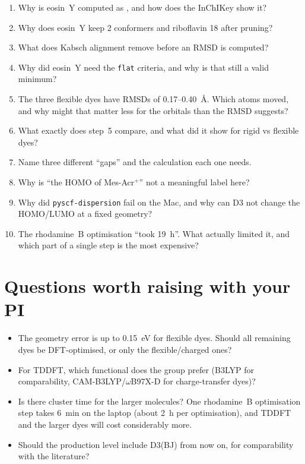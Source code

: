\documentclass[11pt,a4paper]{article}
\begin{document}
\begin{enumerate}
  \item Why is eosin~Y computed as , and how does the InChIKey show it?
  \item Why does eosin~Y keep 2 conformers and riboflavin 18 after pruning?
  \item What does Kabsch alignment remove before an RMSD is computed?
  \item Why did eosin~Y need the \texttt{flat} criteria, and why is that still a valid minimum?
  \item The three flexible dyes have RMSDs of 0.17--0.40~\AA. Which atoms moved, and why might
  that matter less for the orbitals than the RMSD suggests?
  \item What exactly does step~5 compare, and what did it show for rigid vs flexible dyes?
  \item Name three different ``gaps'' and the calculation each one needs.
  \item Why is ``the HOMO of Mes-Acr$^+$'' not a meaningful label here?
  \item Why did \texttt{pyscf-dispersion} fail on the Mac, and why can D3 not change the HOMO/LUMO
  at a fixed geometry?
  \item The rhodamine~B optimisation ``took 19~h''. What actually limited it, and which part of a
  single step is the most expensive?
\end{enumerate}

\section{Questions worth raising with your PI}
\begin{itemize}
  \item The geometry error is up to 0.15~eV for flexible dyes. Should all remaining
  dyes be DFT-optimised, or only the flexible/charged ones?
  \item For TDDFT, which functional does the group prefer (B3LYP for comparability,
  CAM-B3LYP/\allowbreak$\omega$B97X-D for charge-transfer dyes)?
  \item Is there cluster time for the larger molecules? One rhodamine~B optimisation step takes 6~min on the laptop (about 2~h per optimisation), and TDDFT and the larger dyes will cost considerably more.
  \item Should the production level include D3(BJ) from now on, for comparability with the literature?
\end{itemize}
\end{document}
